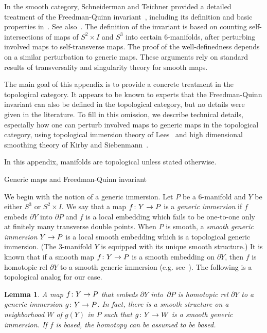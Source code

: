 \documentclass[11pt]{amsart}
\makeatletter
\def\subsection{\@startsection{subsection}{2}%
  \z@{-.8\linespacing\@plus-.3\linespacing}{.5\linespacing\@plus.2\linespacing}%
  {\normalfont\bfseries\large}}
\def\to{\mathchoice{\longrightarrow}{\rightarrow}{\rightarrow}{\rightarrow}}
\newtheorem{lemma}[theorem]{Lemma}
\theoremstyle{definition}
\theoremstyle{theorem-giventitle}
\theoremstyle{definition-giventitle}
\numberwithin{equation}{section}
\makeatother
\begin{document}
In the smooth category, Schneiderman and Teichner provided a detailed treatment of the Freedman-Quinn invariant~\cite{Freedman-Quinn:1990-1,Stong:1993-1}, including its definition and basic properties in~\cite[Section~4]{Schneiderman-Teichner:2022-1}.
See also~\cite{Klug-Miller:2021-1,Klug-Miller:2022-1}.
The definition of the invariant is based on counting self-intersections of maps of 
$S^2\times I$ and $S^3$ into certain 6-manifolds, after perturbing involved maps to self-transverse maps.
The proof of the well-definedness depends on a similar perturbation to generic maps.
These arguments rely on standard results of transversality and singularity theory for smooth maps.

The main goal of this appendix is to provide a concrete treatment in the topological category.
It appears to be known to experts that the Freedman-Quinn invariant can also be defined in the topological category, but no details were given in the literature.
To fill in this omission, we describe technical details, especially how one can perturb involved maps to generic maps in the topological category, using topological immersion theory of Lees~\cite{Lees:1969-1} and high dimensional smoothing theory of Kirby and Siebenmann~\cite{Kirby-Siebenmann:1977-1}.

In this appendix, manifolds are topological unless stated otherwise.


\subsection{Generic maps and Freedman-Quinn invariant}
\label{subsection:generic-maps-fq-top}

We begin with the notion of a generic immersion.
Let $P$ be a 6-manifold and $Y$ be either $S^3$ or $S^2\times I$.
We say that a map $f\colon Y\to P$ is a \emph{generic immersion} if $f$ embeds $\partial Y$ into $\partial P$ and $f$ is a local embedding which fails to be one-to-one only at finitely many transverse double points.
When $P$ is smooth, a \emph{smooth generic immersion} $Y\to P$ is a local smooth embedding which is a topological generic immersion.
(The 3-manifold $Y$ is equipped with its unique smooth structure.)
It is known that if a smooth map $f\colon Y\to P$ is a smooth embedding on $\partial Y$, then $f$ is homotopic rel $\partial Y$ to a smooth generic immersion (e.g. see~\cite[Theorem~2.5]{Haefliger:1961-1}).
The following is a topological analog for our case.

\begin{lemma}
  \label{lemma:homotopy-to-generic-immersion}
  A map $f\colon Y \to P$ that embeds $\partial Y$ into~$\partial P$ is homotopic rel $\partial Y$ to a generic immersion $g\colon Y\to P$.
  In fact, there is a smooth structure on a neighborhood $W$ of $g(Y)$ in $P$ such that $g\colon Y\to W$ is a smooth generic immersion.
  If $f$ is based, the homotopy can be assumed to be based.
\end{lemma}
\end{document}
